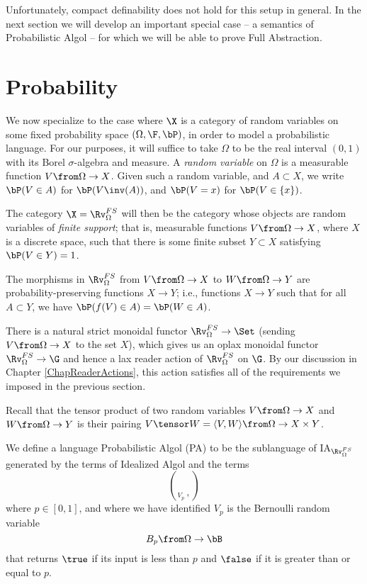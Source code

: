 Unfortunately, compact definability does not hold for this setup in general.  
In the next section we will develop an important special case -- a semantics of Probabilistic Algol -- for which we will be able to prove Full Abstraction.

\section{Probability}

We now specialize to the case where $\X$ is a category of random variables on some fixed probability space $(\Omega,\F,\bP)$, in order to model a probabilistic language.
For our purposes, it will suffice to take $\Omega$ to be the real interval $(0,1)$ with its Borel $\sigma$-algebra and measure.
A \emph{random variable} on $\Omega$ is a measurable function $V \from \Omega \to X$.  
Given such a random variable, and $A\subset X$, we write $\bP(V \in A)$ for $\bP(V\inv(A))$, and $\bP(V = x)$ for $\bP(V \in \{x\})$.

The category $\X = \Rv_\Omega^{FS}$ will then be the category whose objects are random variables of \emph{finite support}; that is, measurable functions $V\from\Omega \to X$, where $X$ is a discrete space, such that there is some finite subset $Y\subset X$ satisfying $\bP(V\in Y) = 1$.

The morphisms in $\Rv_\Omega^{FS}$ from $V\from \Omega \to X$ to $W \from \Omega \to Y$ are probability-preserving functions $X \to Y$; i.e., functions $X \to Y$ such that for all $A \subset Y$, we have $\bP(f(V) \in A) = \bP(W \in A)$.

There is a natural strict monoidal functor $\Rv_{\Omega}^{FS} \to \Set$ (sending $V \from \Omega \to X$ to the set $X$), which gives us an oplax monoidal functor $\Rv_{\Omega}^{FS} \to \G$ and hence a lax reader action of $\Rv_{\Omega}^{FS}$ on $\G$.  
By our discussion in Chapter \ref{ChapReaderActions}, this action satisfies all of the requirements we imposed in the previous section.

Recall that the tensor product of two random variables $V\from \Omega \to X$ and $W \from \Omega \to Y$ is their pairing $V \tensor W = \langle V,W\rangle \from \Omega \to X \times Y$.

We define a language Probabilistic Algol (PA) to be the sublanguage of IA${}_{\Rv_\Omega^{FS}}$ generated by the terms of Idealized Algol and the terms
\[
  \choose_{V_p}\,,
  \]
where $p\in [0,1]$, and where we have identified $V_p$ is the Bernoulli random variable
\[
  B_p \from \Omega \to \bB
  \]
that returns $\true$ if its input is less than $p$ and $\false$ if it is greater than or equal to $p$.

